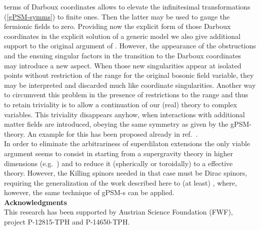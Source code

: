 \documentclass[a4paper,10pt]{article}
\renewcommand{\^}{{}^}
\renewcommand{\_}{\!{}_}
\begin{document}
terms of Darboux  coordinates allows to elevate the 
infinitesimal transformations (\ref{gPSM-symms}) to finite ones. 
Then the  
latter may be used to gauge the fermionic fields to zero. 
Providing now the explicit form of those Darboux coordinates 
in the explicit solution of a generic model we also give 
additional support to the original argument of \cite{Strobl:1999zz}. 
However, the appearance of the obstructions and the ensuing 
singular factors in the transition to the Darboux 
coordinates may introduce a new aspect. When those new 
singularities appear at isolated points without restriction 
of the range for the original bosonic field variable, they 
may be interpreted and discarded much like coordinate singularities. 
Another way to circumvent this problem in the presence of 
restrictions to the range and thus to 
retain triviality is to 
allow a continuation of our (real) theory to complex 
variables.  This triviality disappears anyhow, when 
interactions with additional matter fields are introduced, 
obeying the same symmetry as given by the gPSM-theory. An 
example for this has been proposed already in ref.\  
\cite{Izquierdo:1998hg}. \\
In order to eliminate the arbitrariness of superdilaton 
extensions the only viable argument seems to consist in 
starting from a supergravity theory in higher dimensions 
(e.g.\ \coordHE{}) and to reduce it (spherically or  toroidally)  
 to a \myHighlight{$D=2$}\coordHE{} effective theory. However, the Killing spinors 
needed in that case must be Dirac spinors, requiring the 
generalization of the work \cite{EKS,Ertl:Diss} 
described here to (at least) 
\coordHE{}, where, however, the same technique of gPSM-s can  
be applied. \\[1.5cm]
\noindent
{\large\bf Acknowledgments}
\\[0.5cm]
This research has been supported by Austrian Science 
Foundation (FWF), project P-12815-TPH and P-14650-TPH. 
\end{document}
